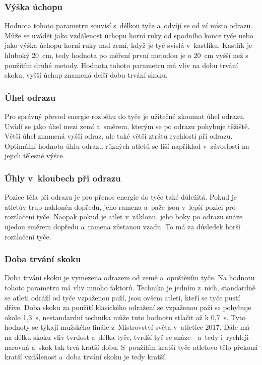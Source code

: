 \subsubsection{Výška úchopu}

Hodnota tohoto parametru souvisí s~délkou tyče a~odvíjí se od ní místo odrazu. Může se uvádět jako vzdálenost úchopu horní ruky od spodního konce tyče nebo jako výška úchopu horní ruky nad zemí, když je tyč svislá v~kastlíku. Kastlík je hluboký 20~cm, tedy hodnota po měření první metodou je o 20~cm vyšší než s použitím druhé metody. Hodnota tohoto parametru má vliv na dobu trvání skoku, vyšší úchup znamená delší dobu trvání skoku.

\subsubsection{Úhel odrazu}

Pro správný převod energie rozběhu do tyče je užitečné zkoumat úhel odrazu. Uvádí se jako úhel mezi zemí a~směrem, kterým se po odrazu pohybuje těžiště. Větší úhel znamená vyšší odraz, ale také větší ztrátu rychlosti při odrazu. Optimální hodnota úhlu odrazu různých atletů se liší například v~závoslosti na jejich tělesné výšce.

\subsubsection{Úhly v~kloubech při odrazu}

Pozice těla při odrazu je pro přenos energie do tyče také důležitá. Pokud je atletův trup nakloněn dopředu, jeho ramena a~paže jsou v~lepší pozici pro roztlačení tyče. Naopak pokud je atlet v~záklonu, jeho boky po odrazu snáze ujedou směrem dopředu a~ramena zůstanou vzadu. To má za důsledek horší roztlačení tyče.

\subsubsection{Doba trvání skoku}

Doba trvání skoku je vymezena odrazem od země a~opuštěním tyče. Na hodnotu tohoto parametru má vliv mnoho faktorů. Technika je jedním z~nich, standardně se atleti odráží od tyče vzpaženou paží, jsou ovšem atleti, kteří se tyče pustí dříve. Doba skoku za použití klasického odražení se vzpaženou paží se pohybuje okolo 1,3~s, nestandardní technika může tuto hodnotu stlačit až k 0,7~s. Tyto hodnoty se týkají mužského finále z~Mistrovství světa v~atletice 2017. Dále má na délku skoku vliv tvrdost a~délka tyče, tvrdší tyč se snáze - a~tedy i~rychleji - narovná a~skok tak trvá kratší dobu. S~použitím kratší tyče atletovo tělo překoná kratší vzdálenost a~doba trvání skoku je tedy kratší.

